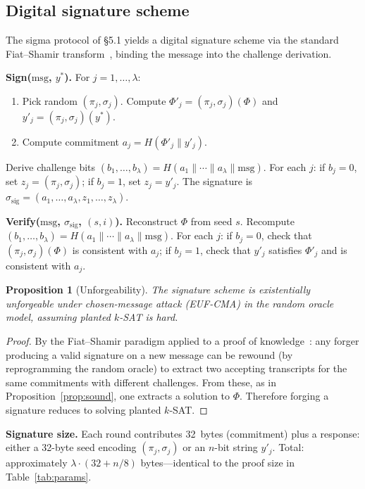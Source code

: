 \documentclass[11pt]{article}
\newtheorem{proposition}[theorem]{Proposition}
\begin{document}
\subsection{Digital signature scheme}\label{sec:sig}

The sigma protocol of \S5.1 yields a digital signature scheme via the standard Fiat--Shamir transform~\cite{FS86}, binding the message into the challenge derivation.

\medskip\noindent\textbf{Sign($\mathrm{msg}$, $y^*$).}  For $j = 1, \ldots, \lambda$:
\begin{enumerate}
\item Pick random $(\pi_j, \sigma_j)$.  Compute $\Phi'_j = (\pi_j, \sigma_j)(\Phi)$ and $y'_j = (\pi_j, \sigma_j)(y^*)$.
\item Compute commitment $a_j = H(\Phi'_j \| y'_j)$.
\end{enumerate}
Derive challenge bits $(b_1, \ldots, b_\lambda) = H(a_1 \| \cdots \| a_\lambda \| \mathrm{msg})$.  For each $j$: if $b_j = 0$, set $z_j = (\pi_j, \sigma_j)$; if $b_j = 1$, set $z_j = y'_j$.  The signature is $\sigma_{\mathrm{sig}} = (a_1, \ldots, a_\lambda, z_1, \ldots, z_\lambda)$.

\medskip\noindent\textbf{Verify($\mathrm{msg}$, $\sigma_{\mathrm{sig}}$, $(s, i)$).}  Reconstruct $\Phi$ from seed $s$.  Recompute $(b_1, \ldots, b_\lambda) = H(a_1 \| \cdots \| a_\lambda \| \mathrm{msg})$.  For each $j$: if $b_j = 0$, check that $(\pi_j, \sigma_j)(\Phi)$ is consistent with $a_j$; if $b_j = 1$, check that $y'_j$ satisfies $\Phi'_j$ and is consistent with $a_j$.

\begin{proposition}[Unforgeability]\label{prop:sig}
The signature scheme is existentially unforgeable under chosen-message attack (EUF-CMA) in the random oracle model, assuming planted $k$-SAT is hard.
\end{proposition}

\begin{proof}
By the Fiat--Shamir paradigm applied to a proof of knowledge~\cite{FS86,GMW91}: any forger producing a valid signature on a new message can be rewound (by reprogramming the random oracle) to extract two accepting transcripts for the same commitments with different challenges.  From these, as in Proposition~\ref{prop:sound}, one extracts a solution to $\Phi$.  Therefore forging a signature reduces to solving planted $k$-SAT.
\end{proof}

\noindent\textbf{Signature size.}  Each round contributes 32~bytes (commitment) plus a response: either a 32-byte seed encoding $(\pi_j, \sigma_j)$ or an $n$-bit string $y'_j$.  Total: approximately $\lambda \cdot (32 + n/8)$ bytes---identical to the proof size in Table~\ref{tab:params}.
\end{document}
